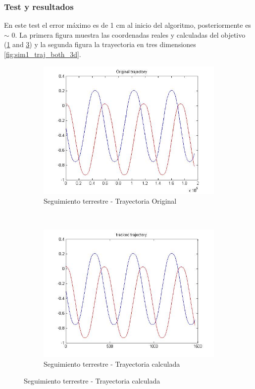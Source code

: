 \subsubsection{Test y resultados}

	En este test el error m\'aximo es de 1 cm al inicio del algoritmo, posteriormente es $\sim$ 0. La primera figura muestra las coordenadas reales y calculadas del objetivo (\ref{fig:sim1_traj_ori} and \ref{fig:sim1_traj_track}) y la segunda figura la trayectoria en tres dimensiones \ref{fig:sim1_traj_both_3d}.
	
\begin{figure}[htp]
	\centering
	\begin{subfigure}{0.45\linewidth}
		\centering
		\includegraphics[width=\linewidth]{../Images/c3/sim1_traj_ori}
		\caption{Seguimiento terrestre - Trayectoria Original}
		\label{fig:sim1_traj_ori}
	\end{subfigure}
	~
	\begin{subfigure}{0.45\linewidth}
		\centering
		\includegraphics[width=\linewidth]{../Images/c3/sim1_traj_track}
		\caption{Seguimiento terrestre - Trayectoria calculada}
		\label{fig:sim1_traj_track}
	\end{subfigure}

\end{figure}


